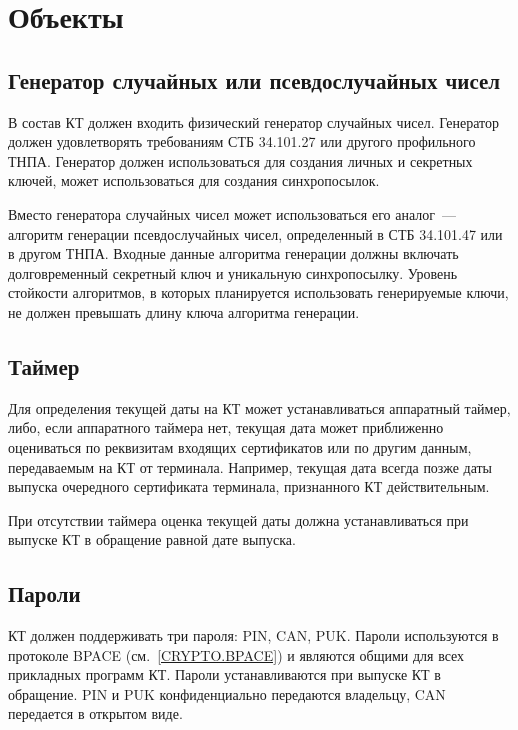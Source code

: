 \chapter{Объекты}\label{OBJ}

\section{Генератор случайных или псевдослучайных чисел}\label{OBJ.RNG}

В состав КТ должен входить физический генератор случайных чисел.
Генератор должен удовлетворять требованиям СТБ 34.101.27 или другого 
профильного ТНПА. Генератор должен использоваться для создания личных и 
секретных ключей, может использоваться для создания синхропосылок. 

Вместо генератора случайных чисел может использоваться его аналог~--- алгоритм 
генерации псевдослучайных чисел, определенный в СТБ 34.101.47 или в другом 
ТНПА. Входные данные алгоритма генерации должны включать долговременный 
секретный ключ и уникальную синхропосылку.
%
Уровень стойкости алгоритмов, в которых планируется использовать 
генерируемые ключи, не должен превышать длину ключа алгоритма генерации.

\section{Таймер}\label{OBJ.Date}

Для определения текущей даты на КТ может устанавливаться аппаратный таймер, либо, 
если аппаратного таймера нет, текущая дата может приближенно оцениваться по 
реквизитам входящих сертификатов или по другим данным, передаваемым на КТ 
от терминала. Например, текущая дата всегда позже даты выпуска очередного 
сертификата терминала, признанного КТ действительным.

При отсутствии таймера оценка текущей даты должна устанавливаться при выпуске 
КТ в обращение равной дате выпуска. 

\section{Пароли}\label{OBJ.PWD}

КТ должен поддерживать три пароля: PIN, CAN, PUK.
Пароли используются в протоколе BPACE (см.~\ref{CRYPTO.BPACE})
и являются общими для всех прикладных программ КТ.
%
Пароли устанавливаются при выпуске КТ в обращение. PIN и PUK конфиденциально 
передаются владельцу, CAN передается в открытом виде.

